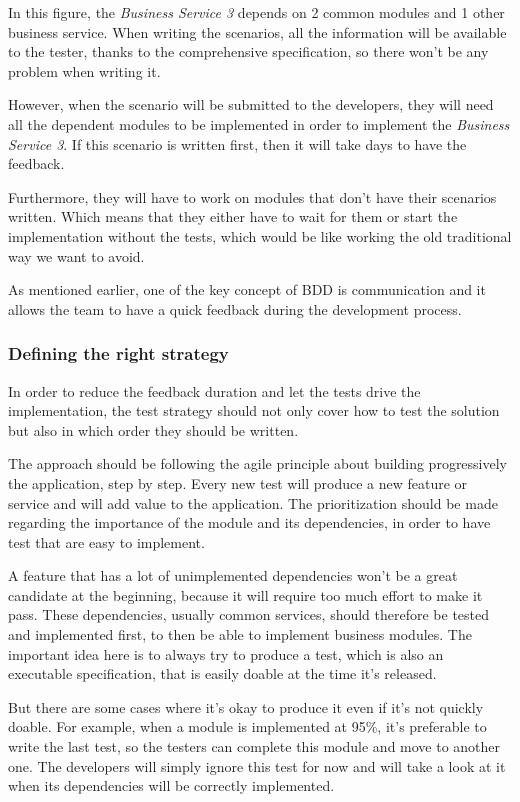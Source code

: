 In this figure, the \textit{Business Service 3} depends on 2 common modules
and 1 other business service.
When writing the scenarios, all the information will be available to the tester,
thanks to the comprehensive specification, so there won't be any problem when
writing it.

However, when the scenario will be submitted to the developers, they will
need all the dependent modules to be implemented in order to implement the
\textit{Business Service 3}.
If this scenario is written first, then it will take days to have the feedback.

Furthermore, they will have to work on modules that don't have their
scenarios written.
Which means that they either have to wait for them or start the
implementation without the tests, which would be like working the old
traditional way we want to avoid.

As mentioned earlier, one of the key concept of BDD is communication and it
allows the team to have a quick feedback during the development process.

\subsubsection{Defining the right strategy}
In order to reduce the feedback duration and let the tests drive the
implementation, the test strategy should not only cover how to test the
solution but also in which order they should be written.

The approach should be following the agile principle about building
progressively the application, step by step.
Every new test will produce a new feature or service and will add value
to the application.
The prioritization should be made regarding the importance of the module and
its dependencies, in order to have test that are easy to implement.

A feature that has a lot of unimplemented dependencies won't be a great
candidate at the beginning, because it will require too much effort to make
it pass.
These dependencies, usually common services, should therefore be tested
and implemented first, to then be able to implement business modules.
The important idea here is to always try to produce a test, which is also an
executable specification, that is easily doable at the time it's released.

But there are some cases where it's okay to produce it even if it's not
quickly doable.
For example, when a module is implemented at 95\%, it's preferable to write
the last test, so the testers can complete this module and move to another one.
The developers will simply ignore this test for now and will take a look at
it when its dependencies will be correctly implemented.

